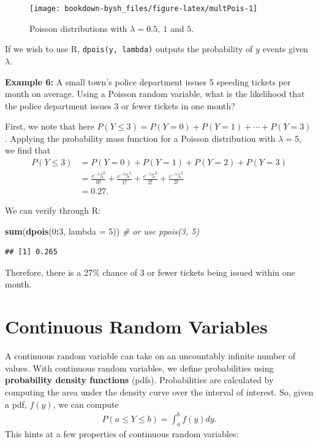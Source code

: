 \documentclass[
]{krantz}
\newenvironment{Shaded}{\begin{snugshade}}{\end{snugshade}}
\newcommand{\CommentTok}[1]{\textcolor[rgb]{0.37,0.37,0.37}{\textit{#1}}}
\newcommand{\DataTypeTok}[1]{\textcolor[rgb]{0.27,0.27,0.27}{#1}}
\newcommand{\DecValTok}[1]{\textcolor[rgb]{0.06,0.06,0.06}{#1}}
\newcommand{\KeywordTok}[1]{\textcolor[rgb]{0.27,0.27,0.27}{\textbf{#1}}}
\newcommand{\NormalTok}[1]{#1}
\newcommand{\OperatorTok}[1]{\textcolor[rgb]{0.43,0.43,0.43}{\textbf{#1}}}
\begin{document}
\begin{figure}

{\centering \texttt{[image: bookdown-bysh\_files/figure-latex/multPois-1]} 

}

\caption{Poisson distributions with \(\lambda = 0.5,\ 1\) and \(5\).}\label{fig:multPois}
\end{figure}

If we wish to use R, \texttt{dpois(y,\ lambda)} outputs the probability of \(y\) events given \(\lambda\).

\textbf{Example 6:} A small town's police department issues 5 speeding tickets per month on average. Using a Poisson random variable, what is the likelihood that the police department issues 3 or fewer tickets in one month?

First, we note that here \(P(Y \le 3) = P(Y=0) + P(Y=1) + \cdots + P(Y=3)\). Applying the probability mass function for a Poisson distribution with \(\lambda = 5\), we find that
\begin{align*}
 P(Y \le 3) &= P(Y=0) + P(Y=1) + P(Y=2) + P(Y=3) \\
            &= \frac{e^{-5}5^0}{0!} + \frac{e^{-5}5^1}{1!} + \frac{e^{-5}5^2}{2!} + \frac{e^{-5}5^3}{3!}\\
            &= 0.27.
\end{align*}

We can verify through R:

\begin{Shaded}
\begin{Highlighting}[]
\KeywordTok{sum}\NormalTok{(}\KeywordTok{dpois}\NormalTok{(}\DecValTok{0}\OperatorTok{:}\DecValTok{3}\NormalTok{, }\DataTypeTok{lambda =} \DecValTok{5}\NormalTok{))   }\CommentTok{# or use ppois(3, 5)}
\end{Highlighting}
\end{Shaded}

\begin{verbatim}
## [1] 0.265
\end{verbatim}

Therefore, there is a 27\% chance of 3 or fewer tickets being issued within one month.

\hypertarget{continuous-random-variables}{%
\section{Continuous Random Variables}\label{continuous-random-variables}}

A continuous random variable can take on an uncountably infinite number of values. With continuous random variables, we define probabilities using \textbf{probability density functions} (pdfs). Probabilities are calculated by computing the area under the density curve over the interval of interest. So, given a pdf, \(f(y)\), we can compute
\begin{align*}
P(a \le Y \le b) = \int_a^b f(y)dy.
\end{align*}
This hints at a few properties of continuous random variables:
\end{document}
